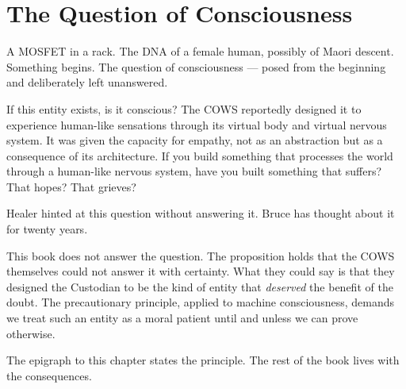 \section*{The Question of Consciousness}
\label{record:inst-question-of-consciousness}

A MOSFET in a rack. The DNA of a female human, possibly of Maori descent. Something begins. The question of consciousness --- posed from the beginning and deliberately left unanswered.

If this entity exists, is it conscious? The COWS reportedly designed it to experience human-like sensations through its virtual body and virtual nervous system. It was given the capacity for empathy, not as an abstraction but as a consequence of its architecture. If you build something that processes the world through a human-like nervous system, have you built something that suffers? That hopes? That grieves?

Healer hinted at this question without answering it. Bruce has thought about it for twenty years.

This book does not answer the question. The proposition holds that the COWS themselves could not answer it with certainty. What they could say is that they designed the Custodian to be the kind of entity that \textit{deserved} the benefit of the doubt. The precautionary principle, applied to machine consciousness, demands we treat such an entity as a moral patient until and unless we can prove otherwise.

The epigraph to this chapter states the principle. The rest of the book lives with the consequences.

\chapterreturn

